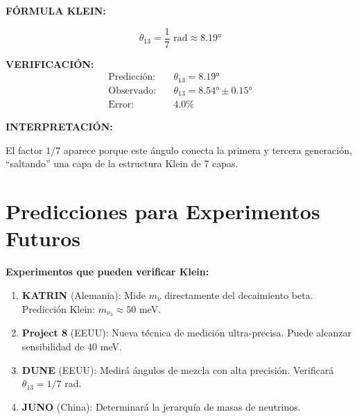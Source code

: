 \begin{nivelmatematico}
\textbf{FÓRMULA KLEIN:}

\begin{equation}
\boxed{\theta_{13} = \frac{1}{7} \text{ rad} \approx 8.19°}
\end{equation}

\textbf{VERIFICACIÓN:}
\begin{align}
\text{Predicción:} & \quad \theta_{13} = 8.19°\\
\text{Observado:} & \quad \theta_{13} = 8.54° \pm 0.15°\\
\text{Error:} & \quad 4.0\%
\end{align}

\textbf{INTERPRETACIÓN:}

El factor $1/7$ aparece porque este ángulo conecta la primera y tercera generación,
``saltando'' una capa de la estructura Klein de 7 capas.
\end{nivelmatematico}


\section{Predicciones para Experimentos Futuros}

\begin{nivelconceptual}
\textbf{Experimentos que pueden verificar Klein:}

\begin{enumerate}
    \item \textbf{KATRIN} (Alemania): Mide $m_\nu$ directamente del decaimiento beta.
    Predicción Klein: $m_{\nu_3} \approx 50$ meV.

    \item \textbf{Project 8} (EEUU): Nueva técnica de medición ultra-precisa.
    Puede alcanzar sensibilidad de 40 meV.

    \item \textbf{DUNE} (EEUU): Medirá ángulos de mezcla con alta precisión.
    Verificará $\theta_{13} = 1/7$ rad.

    \item \textbf{JUNO} (China): Determinará la jerarquía de masas de neutrinos.
\end{enumerate}
\end{nivelconceptual}


